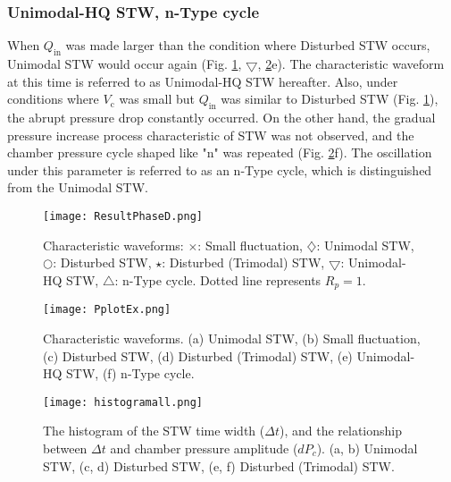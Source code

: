 \documentclass[aps,pre,preprint,groupedaddress,showkeys]{revtex4-2}
\begin{document}
\subsubsection{Unimodal-HQ STW, n-Type cycle}
When $Q_ \mathrm{in}$ was made larger than the condition where Disturbed STW occurs, Unimodal STW would occur again (Fig. \ref{ResultPhaseD}, $\bigtriangledown$, \ref{PplotEx}e).
The characteristic waveform at this time is referred to as Unimodal-HQ STW hereafter.
Also, under conditions where $ V_ \mathrm{c} $ was small but $ Q_\mathrm{in} $ was similar to Disturbed STW (Fig. \ref{ResultPhaseD}), the abrupt pressure drop constantly occurred.
On the other hand, the gradual pressure increase process characteristic of STW was not observed, and the chamber pressure cycle shaped like "n" was repeated (Fig. \ref{PplotEx}f).
The oscillation under this parameter is referred to as an n-Type cycle, which is distinguished from the Unimodal STW.

\begin{figure}
\texttt{[image: ResultPhaseD.png]} 
\caption{\label{ResultPhaseD} Characteristic waveforms: $\times$: Small fluctuation, $\diamondsuit$: Unimodal STW, $\bigcirc$: Disturbed STW, $\star$: Disturbed (Trimodal) STW,  $\bigtriangledown$: Unimodal-HQ STW, $\bigtriangleup$: n-Type cycle. Dotted line represents $R_p = 1$.}
\end{figure} 

\begin{figure}
\texttt{[image: PplotEx.png]} 
\caption{\label{PplotEx}Characteristic waveforms. (a) Unimodal STW, (b) Small fluctuation, (c) Disturbed STW, (d) Disturbed (Trimodal) STW, (e) Unimodal-HQ STW, (f) n-Type cycle.}
\end{figure} 

\begin{figure}
\texttt{[image: histogramall.png]} 
\caption{\label{histogramall}The histogram of the STW time width ($\Delta t$), and the relationship between $\Delta t$ and chamber pressure amplitude ($dP_c$). (a, b) Unimodal STW, (c, d) Disturbed STW, (e, f) Disturbed (Trimodal) STW.}
\end{figure} 
\end{document}
